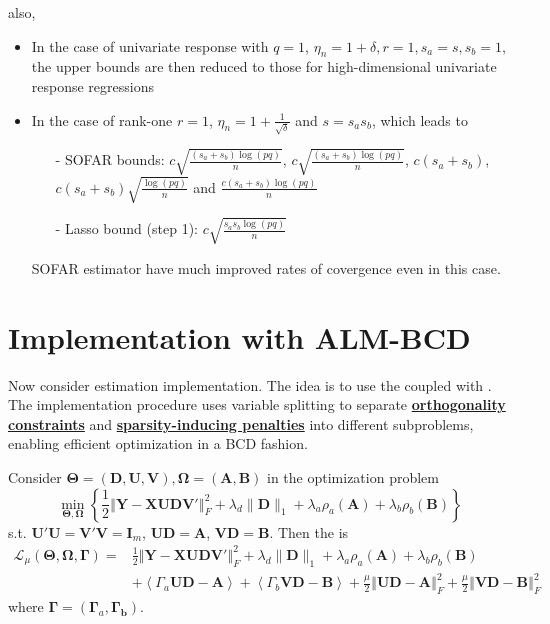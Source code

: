 \documentclass[twoside]{article}
\begin{document}
also,
\begin{itemize}
    \item In the case of univariate response with $q=1$, $\eta_n=1+\delta,r=1,s_a=s,s_b=1$, the upper bounds are then reduced to those for high-dimensional univariate response regressions
    \item In the case of rank-one $r=1$, $\eta_n = 1+\frac{1}{\sqrt{\delta}}$ and $s=s_as_b$, which leads to
    \begin{itemize}
        \item[-] SOFAR bounds: $c\sqrt{\frac{(s_a+s_b)\log(pq)}{n}}$, $c\sqrt{\frac{(s_a+s_b)\log(pq)}{n}}$, $c(s_a+s_b)$, $c(s_a+s_b)\sqrt{\frac{\log(pq)}{n}}$ and $\frac{c(s_a+s_b)\log(pq)}{n}$
        \item[-] Lasso bound (step 1): $c\sqrt{\frac{s_as_b\log(pq)}{n}}$
    \end{itemize}
    SOFAR estimator have much improved rates of covergence even in this case.
\end{itemize}

\section{Implementation with ALM-BCD}
Now consider estimation implementation. The idea is to use the  coupled with . The implementation procedure uses variable splitting to separate \underline{\textbf{orthogonality constraints}} and \underline{\textbf{sparsity-inducing penalties}} into different subproblems, enabling efficient optimization in a BCD fashion.

Consider $\boldsymbol{\Theta} = (\mathbf{D,U,V}),\boldsymbol{\Omega}=(\mathbf{A,B})$ in the optimization problem
$$
\min_{\boldsymbol{\Theta,\Omega}}\left\{ \frac{1}{2}\left\Vert \mathbf{Y-XUDV}' \right\Vert _F^2 + \lambda_d \lVert \mathbf{D} \rVert _1 + \lambda_a \rho_a (\mathbf{A}) + \lambda_b \rho_b (\mathbf{B})\right\}
$$
s.t. $\mathbf{U'U}=\mathbf{V'V}=\mathbf{I}_m$, $\mathbf{UD}=\mathbf{A}$, $\mathbf{VD}=\mathbf{B}$. Then the  is
\begin{align*}
    \mathcal{L}_{\mu}\left( \boldsymbol{\Theta,\Omega,\Gamma} \right) =& \frac{1}{2} \left\Vert \mathbf{Y-XUDV}' \right\Vert _F^2 + \lambda_d \lVert \mathbf{D} \rVert _1 + \lambda_a \rho_a (\mathbf{A}) + \lambda_b \rho_b (\mathbf{B}) \\
    & + \left< \Gamma_a \mathbf{UD-A} \right> + \left< \Gamma_b \mathbf{VD-B} \right> + \frac{\mu}{2}\left\Vert \mathbf{UD-A} \right\Vert^2_F + \frac{\mu}{2}\left\Vert \mathbf{VD-B} \right\Vert^2_F 
\end{align*}
where $\boldsymbol{\Gamma} = \left( \boldsymbol{\Gamma}_a,\boldsymbol{\Gamma_b} \right)$.


%
%
\end{document}
